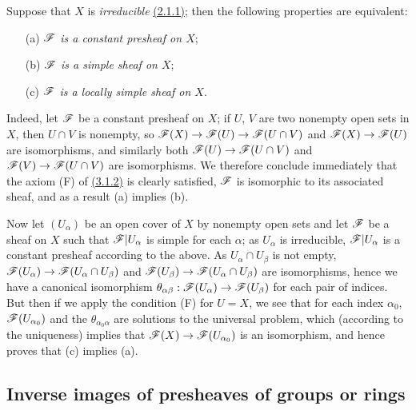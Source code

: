 \begin{env}[3.6.2]
\label{env-0.3.6.2}
Suppose that $X$ is {\em irreducible} \hyperref[env-0.2.1.1]{(2.1.1)}; then the following
properties are equivalent:
\begin{itemize}
  \item[(a)] {\em $\mathscr{F}$ is a constant presheaf on $X$};
  \item[(b)] {\em $\mathscr{F}$ is a simple sheaf on $X$};
  \item[(c)] {\em $\mathscr{F}$ is a locally simple sheaf on $X$}.
\end{itemize}
\end{env}

Indeed, let $\mathscr{F}$ be a constant presheaf on $X$; if $U$, $V$ are two nonempty
open sets in $X$, then $U\cap V$ is nonempty, so
$\mathscr{F}(X)\to\mathscr{F}(U)\to\mathscr{F}(U\cap V)$ and $\mathscr{F}(X)\to\mathscr{F}(U)$ are
isomorphisms, and similarly both $\mathscr{F}(U)\to\mathscr{F}(U\cap V)$ and
$\mathscr{F}(V)\to\mathscr{F}(U\cap V)$ are isomorphisms. We therefore conclude
immediately that the axiom (F) of \hyperref[env-0.3.1.2]{(3.1.2)} is clearly satisfied,
$\mathscr{F}$ is isomorphic to its associated sheaf, and as a result (a) implies (b).

Now let $(U_\alpha)$ be an open cover of $X$ by nonempty open sets and let
$\mathscr{F}$ be a sheaf on $X$ such that $\mathscr{F}|U_\alpha$ is simple for each
$\alpha$; as $U_\alpha$ is irreducible, $\mathscr{F}|U_\alpha$ is a constant presheaf
according to the above. As $U_\alpha\cap U_\beta$ is not empty,
$\mathscr{F}(U_\alpha)\to\mathscr{F}(U_\alpha\cap U_\beta)$ and
$\mathscr{F}(U_\beta)\to\mathscr{F}(U_\alpha\cap U_\beta)$ are isomorphisms, hence we have
a canonical isomorphism
$\theta_{\alpha\beta}:\mathscr{F}(U_\alpha)\to\mathscr{F}(U_\beta)$ for each pair of
indices. But then if we apply the condition (F) for $U=X$, we see that for each
index $\alpha_0$, $\mathscr{F}(U_{\alpha_0})$ and the $\theta_{\alpha_0\alpha}$ are
solutions to the universal problem, which (according to the uniqueness) implies
that $\mathscr{F}(X)\to\mathscr{F}(U_{\alpha_0})$ is an isomorphism, and hence proves that
(c) implies (a).

\subsection{Inverse images of presheaves of groups or rings}
\label{subsection-inverse-images-of-psh-grps-or-rings}

